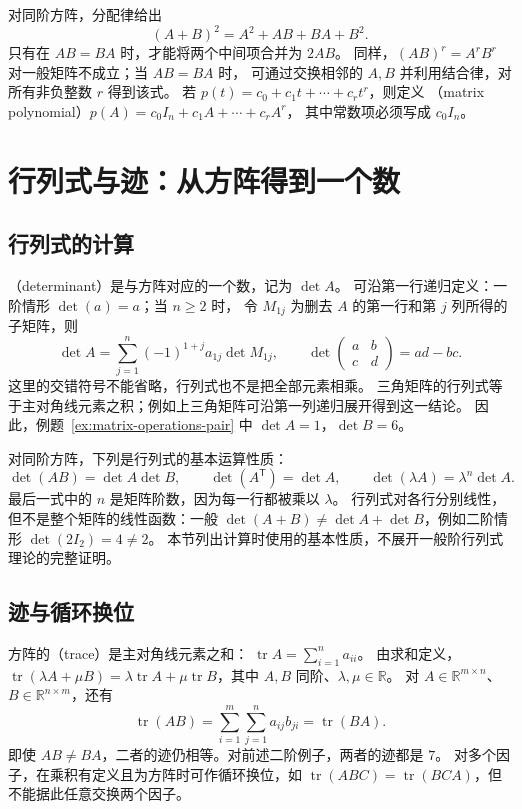\documentclass[UTF8,12pt,a4paper,fontset=fandol]{ctexart}
\begin{document}
对同阶方阵，分配律给出
\[
  (A+B)^2=A^2+AB+BA+B^2.
\]
只有在 $AB=BA$ 时，才能将两个中间项合并为 $2AB$。
同样，$(AB)^r=A^rB^r$ 对一般矩阵不成立；当 $AB=BA$ 时，
可通过交换相邻的 $A,B$ 并利用结合律，对所有非负整数 $r$ 得到该式。
若 $p(t)=c_0+c_1t+\cdots+c_rt^r$，则定义
（matrix polynomial）$p(A)=c_0I_n+c_1A+\cdots+c_rA^r$，
其中常数项必须写成 $c_0I_n$。

\section{行列式与迹：从方阵得到一个数}
\label{sec:matrix-determinant-trace}

\subsection{行列式的计算}

（determinant）是与方阵对应的一个数，记为 $\det A$。
可沿第一行递归定义：一阶情形 $\det(a)=a$；当 $n\ge2$ 时，
令 $M_{1j}$ 为删去 $A$ 的第一行和第 $j$ 列所得的子矩阵，则
\[
  \det A=\sum_{j=1}^n(-1)^{1+j}a_{1j}\det M_{1j},\qquad
  \det\begin{pmatrix}a&b\\c&d\end{pmatrix}=ad-bc.
\]
这里的交错符号不能省略，行列式也不是把全部元素相乘。
三角矩阵的行列式等于主对角线元素之积；例如上三角矩阵可沿第一列递归展开得到这一结论。
因此，例题~\ref{ex:matrix-operations-pair} 中 $\det A=1$，$\det B=6$。

对同阶方阵，下列是行列式的基本运算性质：
\[
  \det(AB)=\det A\det B,\qquad
  \det(A^{\mathsf T})=\det A,\qquad
  \det(\lambda A)=\lambda^n\det A.
\]
最后一式中的 $n$ 是矩阵阶数，因为每一行都被乘以 $\lambda$。
行列式对各行分别线性，但不是整个矩阵的线性函数：一般
$\det(A+B)\ne\det A+\det B$，例如二阶情形 $\det(2I_2)=4\ne2$。
本节列出计算时使用的基本性质，不展开一般阶行列式理论的完整证明。

\subsection{迹与循环换位}

方阵的（trace）是主对角线元素之和：
$\operatorname{tr}A=\sum_{i=1}^n a_{ii}$。
由求和定义，$\operatorname{tr}(\lambda A+\mu B)
=\lambda\operatorname{tr}A+\mu\operatorname{tr}B$，其中 $A,B$ 同阶、$\lambda,\mu\in\mathbb R$。
对 $A\in\mathbb R^{m\times n}$、$B\in\mathbb R^{n\times m}$，还有
\[
  \operatorname{tr}(AB)=\sum_{i=1}^m\sum_{j=1}^n a_{ij}b_{ji}
  =\operatorname{tr}(BA).
\]
即使 $AB\ne BA$，二者的迹仍相等。对前述二阶例子，两者的迹都是 $7$。
对多个因子，在乘积有定义且为方阵时可作循环换位，如
$\operatorname{tr}(ABC)=\operatorname{tr}(BCA)$，但不能据此任意交换两个因子。
\end{document}
